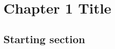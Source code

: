 \chapter{Chapter 1 Title}
\label{chapter1}

\section{Starting section}
\lipsum[1-1] \cite{parikh1980adaptive}